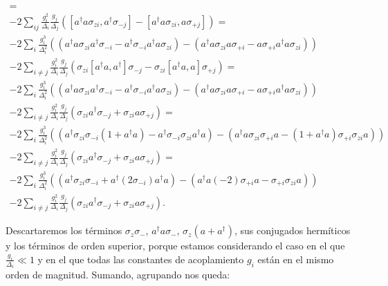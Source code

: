 \begin{multline}
[- 2 \sum\limits_{i} \frac{g_i^2}{\Delta_i} a^\dagger a \sigma_{zi}, \sum\limits_j \frac{g_j} {\Delta_j} (a^\dagger \sigma_{-j} - a \sigma_{+j})] = \\
- 2 \sum\limits_{ij} \frac{g_i^2}{\Delta_i} \frac{g_j}{\Delta_j} \left(
[a^\dagger a \sigma_{zi}, a^\dagger \sigma_{-j}] -
[a^\dagger a \sigma_{zi}, a \sigma_{+j}]
\right) = \\
- 2 \sum\limits_{i} \frac{g_i^3}{\Delta_i^2} \left(
(a^\dagger a \sigma_{zi} a^\dagger \sigma_{-i} - a^\dagger \sigma_{-i} a^\dagger a \sigma_{zi}) -
(a^\dagger a \sigma_{zi} a \sigma_{+i} - a \sigma_{+i} a^\dagger a \sigma_{zi})
\right) \\
- 2 \sum\limits_{i \neq j} \frac{g_i^2}{\Delta_i} \frac{g_j}{\Delta_j} \left(
\sigma_{zi} [a^\dagger a, a^\dagger] \sigma_{-j} -
\sigma_{zi} [a^\dagger a, a] \sigma_{+j}
\right) = \\
- 2 \sum\limits_{i} \frac{g_i^3}{\Delta_i^2} \left(
(a^\dagger a \sigma_{zi} a^\dagger \sigma_{-i} - a^\dagger \sigma_{-i} a^\dagger a \sigma_{zi}) -
(a^\dagger a \sigma_{zi} a \sigma_{+i} - a \sigma_{+i} a^\dagger a \sigma_{zi})
\right) \\
- 2 \sum\limits_{i \neq j} \frac{g_i^2}{\Delta_i} \frac{g_j}{\Delta_j} \left(
\sigma_{zi} a^\dagger \sigma_{-j} +
\sigma_{zi} a \sigma_{+j}
\right) = \\
- 2 \sum\limits_{i} \frac{g_i^3}{\Delta_i^2} \left(
(a^\dagger \sigma_{zi} \sigma_{-i} (1 + a^\dagger a) - a^\dagger \sigma_{-i} \sigma_{zi} a^\dagger a) -
(a^\dagger a \sigma_{zi} \sigma_{+i} a - (1 + a^\dagger a) \sigma_{+i} \sigma_{zi} a)
\right) \\
- 2 \sum\limits_{i \neq j} \frac{g_i^2}{\Delta_i} \frac{g_j}{\Delta_j} \left(
\sigma_{zi} a^\dagger \sigma_{-j} +
\sigma_{zi} a \sigma_{+j}
\right) = \\
- 2 \sum\limits_{i} \frac{g_i^3}{\Delta_i^2} \left(
(a^\dagger \sigma_{zi} \sigma_{-i} + a^\dagger (2 \sigma_{-i}) a^\dagger a) -
(a^\dagger a (-2) \sigma_{+i} a - \sigma_{+i} \sigma_{zi} a)
\right) \\
- 2 \sum\limits_{i \neq j} \frac{g_i^2}{\Delta_i} \frac{g_j}{\Delta_j} \left(
\sigma_{zi} a^\dagger \sigma_{-j} +
\sigma_{zi} a \sigma_{+j}
\right) .
\end{multline}

Descartaremos los términos $\sigma_z \sigma_-$, $a^\dagger a \sigma_-$, $\sigma_z (a + a^\dagger)$, sus conjugados hermíticos y los términos de orden superior, porque estamos considerando el caso en el que $\frac{g_i}{\Delta_i} \ll 1$ y en el que todas las constantes de acoplamiento $g_i$ están en el mismo orden de magnitud. Sumando, agrupando nos queda:

